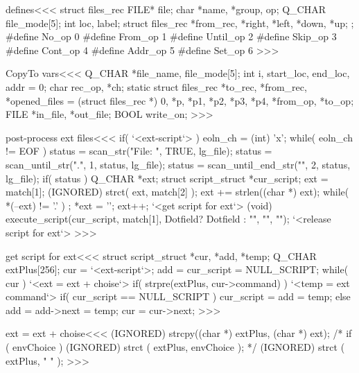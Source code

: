 \<defines\><<<
struct files_rec{
  FILE* file;
  char *name, *group, op;
  Q_CHAR file_mode[5];
  int loc, label;
  struct files_rec  *from_rec, *right, *left, *down, *up;
};
#define No_op     0
#define From_op   1
#define Until_op  2
#define Skip_op   3
#define Cont_op   4
#define Addr_op   5
#define Set_op    6
>>>

\<CopyTo vars\><<<
Q_CHAR *file_name, file_mode[5];
int i, start_loc, end_loc, addr = 0;
char rec_op, *ch;
static struct files_rec *to_rec, *from_rec,
   *opened_files = (struct files_rec *) 0,
   *p, *p1, *p2, *p3, *p4, *from_op, *to_op;
FILE *in_file, *out_file;
BOOL write_on;
>>>

















\<post-process ext files\><<<
if( `<ext-script`> ){
  eoln_ch = (int) 'x';
  while( eoln_ch != EOF ) {
     status = scan_str("File: ", TRUE, lg_file);
     status = scan_until_str(".", 1, status, lg_file);
     status = scan_until_end_str("", 2, status, lg_file);
     if( status ){                  Q_CHAR *ext;
                      struct script_struct *cur_script;
        ext = match[1];
        (IGNORED) strct( ext, match[2] );
        ext += strlen((char *) ext);
        while( *(--ext) != '.' ){ ; }
        *ext = '\0'; ext++;
        `<get script for ext`>
        (void) execute_script(cur_script, 
                 match[1], Dotfield? Dotfield : "", "", "");  
        `<release script for ext`>
} }  }
>>>


\<get script for ext\><<<
{
            struct script_struct *cur, *add, *temp;
            Q_CHAR extPlus[256];                     
  cur = `<ext-script`>;
  add = cur_script = NULL_SCRIPT;
  while( cur ){
     `<ext = ext + choise`>
     if( strpre(extPlus, cur->command) ){
        `<temp = ext command`>
        if( cur_script == NULL_SCRIPT ){
           cur_script = add = temp;
        } else {
           add = add->next = temp;
     }  }
     cur = cur->next;
} }  
>>>



\<ext = ext + choise\><<<
(IGNORED) strcpy((char *) extPlus, (char *) ext);
/* 
   if ( envChoice ) {
      (IGNORED) strct ( extPlus, envChoice );
   }
*/
(IGNORED) strct ( extPlus, " " );
>>>
 
